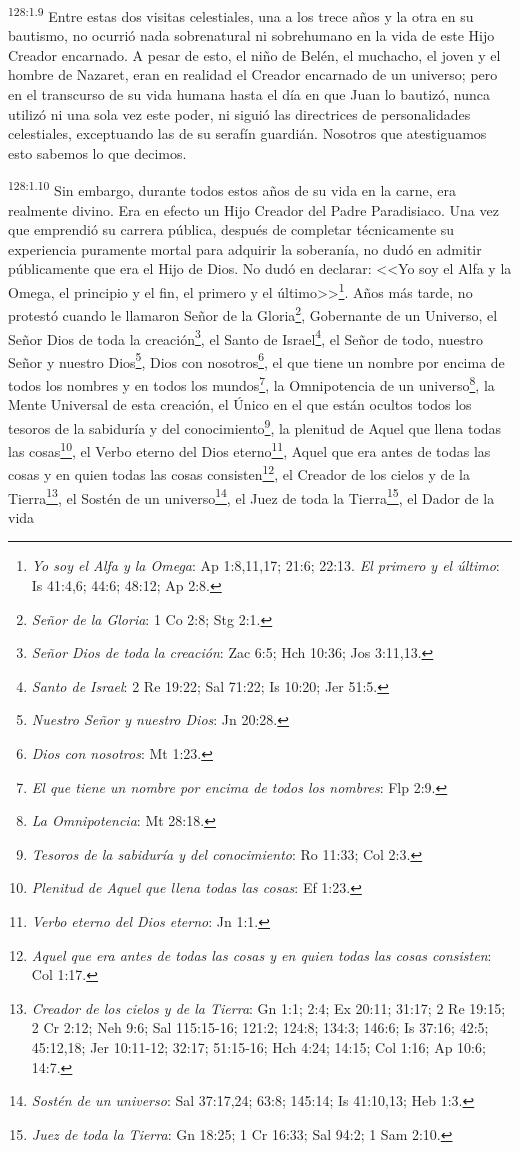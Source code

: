 \par 
\textsuperscript{128:1.9} Entre estas dos visitas celestiales, una a los trece años y la otra en su bautismo, no ocurrió nada sobrenatural ni sobrehumano en la vida de este Hijo Creador encarnado. A pesar de esto, el niño de Belén, el muchacho, el joven y el hombre de Nazaret, eran en realidad el Creador encarnado de un universo; pero en el transcurso de su vida humana hasta el día en que Juan lo bautizó, nunca utilizó ni una sola vez este poder, ni siguió las directrices de personalidades celestiales, exceptuando las de su serafín guardián. Nosotros que atestiguamos esto sabemos lo que decimos.

\par 
\textsuperscript{128:1.10} Sin embargo, durante todos estos años de su vida en la carne, era realmente divino. Era en efecto un Hijo Creador del Padre Paradisiaco. Una vez que emprendió su carrera pública, después de completar técnicamente su experiencia puramente mortal para adquirir la soberanía, no dudó en admitir públicamente que era el Hijo de Dios. No dudó en declarar: <<Yo soy el Alfa y la Omega, el principio y el fin, el primero y el último>>\footnote{\textit{Yo soy el Alfa y la Omega}: Ap 1:8,11,17; 21:6; 22:13. \textit{El primero y el último}: Is 41:4,6; 44:6; 48:12; Ap 2:8.}. Años más tarde, no protestó cuando le llamaron Señor de la Gloria\footnote{\textit{Señor de la Gloria}: 1 Co 2:8; Stg 2:1.}, Gobernante de un Universo, el Señor Dios de toda la creación\footnote{\textit{Señor Dios de toda la creación}: Zac 6:5; Hch 10:36; Jos 3:11,13.}, el Santo de Israel\footnote{\textit{Santo de Israel}: 2 Re 19:22; Sal 71:22; Is 10:20; Jer 51:5.}, el Señor de todo, nuestro Señor y nuestro Dios\footnote{\textit{Nuestro Señor y nuestro Dios}: Jn 20:28.}, Dios con nosotros\footnote{\textit{Dios con nosotros}: Mt 1:23.}, el que tiene un nombre por encima de todos los nombres y en todos los mundos\footnote{\textit{El que tiene un nombre por encima de todos los nombres}: Flp 2:9.}, la Omnipotencia de un universo\footnote{\textit{La Omnipotencia}: Mt 28:18.}, la Mente Universal de esta creación, el Único en el que están ocultos todos los tesoros de la sabiduría y del conocimiento\footnote{\textit{Tesoros de la sabiduría y del conocimiento}: Ro 11:33; Col 2:3.}, la plenitud de Aquel que llena todas las cosas\footnote{\textit{Plenitud de Aquel que llena todas las cosas}: Ef 1:23.}, el Verbo eterno del Dios eterno\footnote{\textit{Verbo eterno del Dios eterno}: Jn 1:1.}, Aquel que era antes de todas las cosas y en quien todas las cosas consisten\footnote{\textit{Aquel que era antes de todas las cosas y en quien todas las cosas consisten}: Col 1:17.}, el Creador de los cielos y de la Tierra\footnote{\textit{Creador de los cielos y de la Tierra}: Gn 1:1; 2:4; Ex 20:11; 31:17; 2 Re 19:15; 2 Cr 2:12; Neh 9:6; Sal 115:15-16; 121:2; 124:8; 134:3; 146:6; Is 37:16; 42:5; 45:12,18; Jer 10:11-12; 32:17; 51:15-16; Hch 4:24; 14:15; Col 1:16; Ap 10:6; 14:7.}, el Sostén de un universo\footnote{\textit{Sostén de un universo}: Sal 37:17,24; 63:8; 145:14; Is 41:10,13; Heb 1:3.}, el Juez de toda la Tierra\footnote{\textit{Juez de toda la Tierra}: Gn 18:25; 1 Cr 16:33; Sal 94:2; 1 Sam 2:10.}, el Dador de la vida 